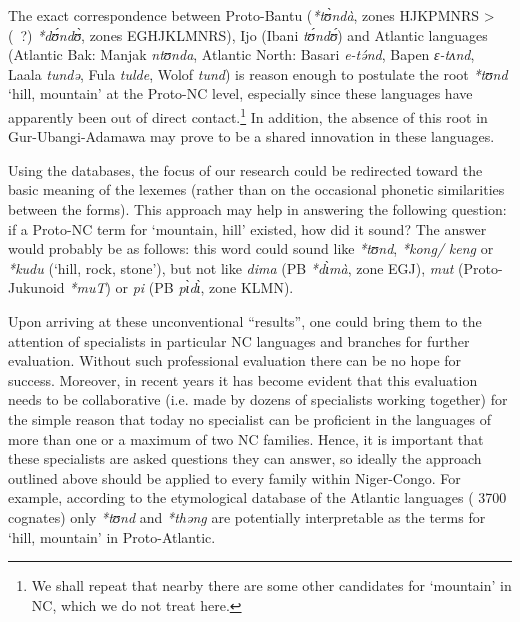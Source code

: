 \begin{table}
\caption{\textit{*tʊnd} ‘hill, mountain’ in Niger-Congo} 
\label{tab:0.4}

\end{table}

The exact correspondence between Proto-Bantu (\textit{*t{\`{ʊ}}ndà}, zones HJKPMNRS > (~?) \textit{*d{\'{ʊ}}nd{\`{ʊ}}},  zones EGHJKLMNRS), Ijo (Ibani \textit{t{\'{ʊ}}nd{\'{ʊ}}}) and Atlantic languages (Atlantic Bak: Manjak \textit{ntʊnda}, Atlantic North: Basari \textit{e-t{\'{ə}}nd}, Bapen \textit{ɛ{}-tʌnd}, Laala \textit{tundə}, Fula \textit{tulde}, Wolof \textit{tund}) is reason enough to postulate the root \textit{*tʊnd} ‘hill, mountain’ at the Proto-NC level, especially since these languages have apparently been out of direct contact.\footnote{We shall repeat that nearby there are some other candidates for ‘mountain’ in NC, which we do not treat here.} In addition, the absence of this root in Gur{}-Ubangi{}-Adamawa may prove to be a shared innovation in these languages.

Using the databases, the focus of our research could be redirected toward the basic meaning of the lexemes (rather than on the occasional phonetic similarities between the forms). This approach may help in answering the following question: if a Proto-NC term for ‘mountain, hill’ existed, how did it sound? The answer would probably be as follows: this word could sound like \textit{*tʊnd}, \textit{*kong/} \textit{keng} or \textit{*kudu} (‘hill, rock, stone’), but not like \textit{dima} (PB \textit{*d{\`{ɩ}}m{\`{a}}}, zone EGJ), \textit{mut} (Proto-Jukunoid \textit{*muT}) or \textit{pi} (PB \textit{p{\`{ɩ}}d{\`{ɩ}}}, zone KLMN). 

Upon arriving at these unconventional “results”, one could bring them to the attention of specialists in particular NC languages and branches for further evaluation. Without such professional evaluation there can be no hope for success.  Moreover, in recent years it has become evident that this evaluation needs to be collaborative (i.e. made by dozens of specialists working together) for the simple reason that today no specialist can be proficient in the languages of more than one or a maximum of two NC families. Hence, it is important that these specialists are asked questions they can answer, so ideally the approach outlined above should be applied to every family within Niger-Congo. For example, according to the etymological database of the Atlantic languages (\citealt{PozdniakovSegerer2017} 3700 cognates) only \textit{*t}\textit{ʊnd} and \textit{*th}\textit{əng} are potentially interpretable as the terms for ‘hill, mountain’ in Proto-Atlantic.

